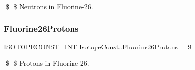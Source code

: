 \$ \$ Neutrons in Fluorine-\/26. \mbox{\label{group___isotope_const-_fluorine-_f26_ga1a5dd2da18d0cbbc7d6fb87618d011fc}} 
\subsubsection{\texorpdfstring{Fluorine26\+Protons}{Fluorine26Protons}}
{\footnotesize\ttfamily \mbox{\hyperlink{group___isotope_const-_macros_ga5f18360b3e99483a35c32d789e62621c}{I\+S\+O\+T\+O\+P\+E\+C\+O\+N\+S\+T\+\_\+\+I\+NT}} Isotope\+Const\+::\+Fluorine26\+Protons = 9}

\$ \$ Protons in Fluorine-\/26. 